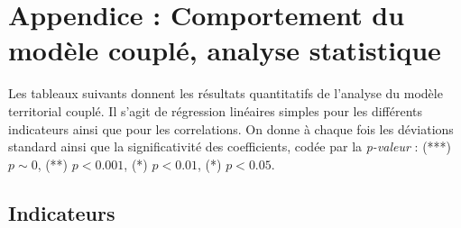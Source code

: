 \footnotesize








\newpage

\normalsize




\section*{Appendice : Comportement du modèle couplé, analyse statistique}

Les tableaux suivants donnent les résultats quantitatifs de l'analyse du modèle territorial couplé. Il s'agit de régression linéaires simples pour les différents indicateurs ainsi que pour les correlations. On donne à chaque fois les déviations standard ainsi que la significativité des coefficients, codée par la \emph{p-valeur} : (***) $p\sim 0$, (**) $p<0.001$, (*) $p<0.01$, (*) $p<0.05$.

\subsection*{Indicateurs}

